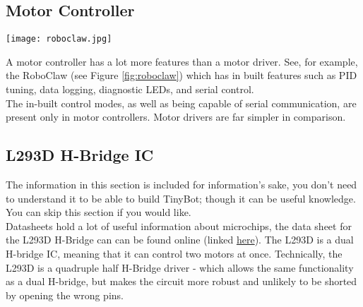 \documentclass[../TinyBot.tex]{subfiles}
\begin{document}
\subsection{Motor Controller}

\begin{minipage}{0.3\textwidth}\vspace{0pt}
    \texttt{[image: roboclaw.jpg]}
    \label{fig:roboclaw}
\end{minipage}
\begin{minipage}{0.7\textwidth}\vspace{0pt}
    A motor controller has a lot more features than a motor driver. See, for example, the RoboClaw  (see Figure \ref{fig:roboclaw}) which has in built features such as PID tuning, data logging, diagnostic LEDs, and serial control. \\
    
    
    The in-built control modes, as well as being capable of serial communication, are present only in motor controllers. Motor drivers are far simpler in comparison. \\

\end{minipage}

\pagebreak
\subsection{L293D H-Bridge IC}

The information in this section is included for information's sake, you don't need to understand it to be able to build TinyBot; though it can be useful knowledge. You can skip this section if you would like. \\



Datasheets hold a lot of useful information about microchips, the data sheet for the L293D H-Bridge can can be found online (linked \href{https://www.altronics.com.au/p/z2900-l293d-motor-drive-ic/}{here}). The L293D is a dual H-bridge IC, meaning that it can control two motors at once. Technically, the L293D is a quadruple half H-Bridge driver - which allows the same functionality as a dual H-bridge, but makes the circuit more robust and unlikely to be shorted by opening the wrong pins. \\
\end{document}
